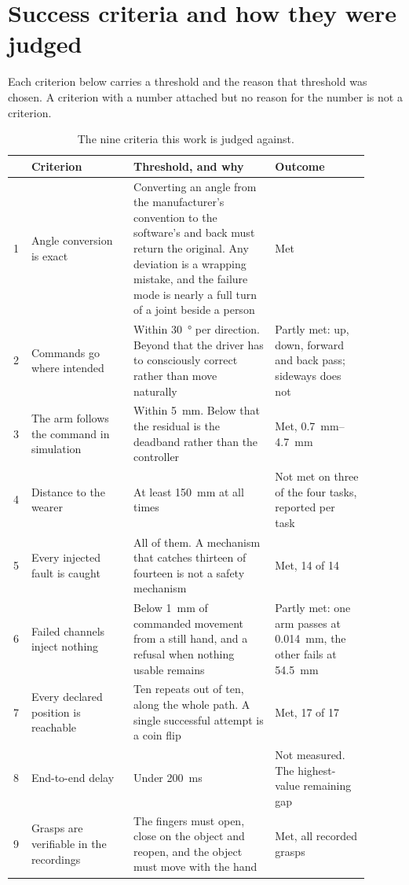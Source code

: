 \appendix

\chapter{Success criteria and how they were judged}
\label{app:criteria}

Each criterion below carries a threshold and the reason that threshold was
chosen. A criterion with a number attached but no reason for the number is not
a criterion.

\begin{table}[H]
  \centering
  \small
  \caption[Success criteria]{The nine criteria this work is judged against.}
  \label{tab:criteria}
  \begin{tabular}{@{}p{0.04\linewidth}p{0.26\linewidth}p{0.36\linewidth}p{0.24\linewidth}@{}}
    \toprule
    & \textbf{Criterion} & \textbf{Threshold, and why} & \textbf{Outcome} \\
    \midrule
    1 & Angle conversion is exact & Converting an angle from the
      manufacturer's convention to the software's and back must return the
      original. Any deviation is a wrapping mistake, and the failure mode is
      nearly a full turn of a joint beside a person & Met \\
    2 & Commands go where intended & Within \SI{30}{\degree} per direction.
      Beyond that the driver has to consciously correct rather than move
      naturally & Partly met: up, down, forward and back pass; sideways does
      not \\
    3 & The arm follows the command in simulation & Within
      \SI{5}{\milli\metre}. Below that the residual is the deadband rather
      than the controller & Met, \SIrange{0.7}{4.7}{\milli\metre} \\
    4 & Distance to the wearer & At least \SI{150}{\milli\metre} at all times
      & Not met on three of the four tasks, reported per task \\
    5 & Every injected fault is caught & All of them. A mechanism that catches
      thirteen of fourteen is not a safety mechanism & Met, 14 of 14 \\
    6 & Failed channels inject nothing & Below \SI{1}{\milli\metre} of
      commanded movement from a still hand, and a refusal when nothing usable
      remains & Partly met: one arm passes at
      \SI{0.014}{\milli\metre}, the other fails at \SI{54.5}{\milli\metre} \\
    7 & Every declared position is reachable & Ten repeats out of ten, along
      the whole path. A single successful attempt is a coin flip & Met, 17 of
      17 \\
    8 & End-to-end delay & Under \SI{200}{\milli\second} & Not measured. The
      highest-value remaining gap \\
    9 & Grasps are verifiable in the recordings & The fingers must open, close
      on the object and reopen, and the object must move with the hand & Met,
      all recorded grasps \\
    \bottomrule
  \end{tabular}
\end{table}

